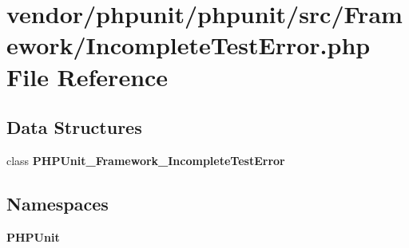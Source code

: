 \section{vendor/phpunit/phpunit/src/\+Framework/\+Incomplete\+Test\+Error.php File Reference}
\label{_incomplete_test_error_8php}
\subsection*{Data Structures}
\begin{DoxyCompactItemize}
\item 
class {\bf P\+H\+P\+Unit\+\_\+\+Framework\+\_\+\+Incomplete\+Test\+Error}
\end{DoxyCompactItemize}
\subsection*{Namespaces}
\begin{DoxyCompactItemize}
\item 
 {\bf P\+H\+P\+Unit}
\end{DoxyCompactItemize}
